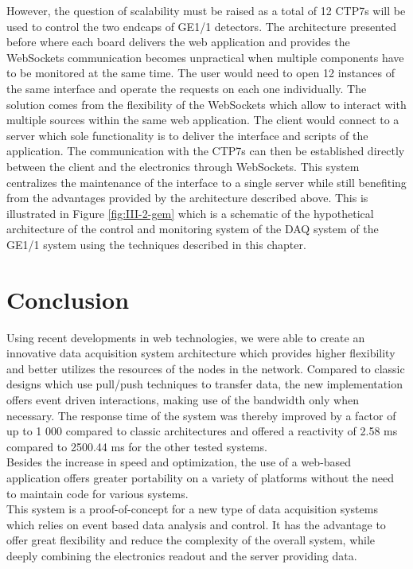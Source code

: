     However, the question of scalability must be raised as a total of 12 CTP7s will be used to control the two endcaps of GE1/1 detectors. The architecture presented before where each board delivers the web application and provides the WebSockets communication becomes unpractical when multiple components have to be monitored at the same time. The user would need to open 12 instances of the same interface and operate the requests on each one individually. The solution comes from the flexibility of the WebSockets which allow to interact with multiple sources within the same web application. The client would connect to a server which sole functionality is to deliver the interface and scripts of the application. The communication with the CTP7s can then be established directly between the client and the electronics through WebSockets. This system centralizes the maintenance of the interface to a single server while still benefiting from the advantages provided by the architecture described above. This is illustrated in Figure \ref{fig:III-2-gem} which is a schematic of the hypothetical architecture of the control and monitoring system of the DAQ system of the GE1/1 system using the techniques described in this chapter.

  \section{Conclusion}

    Using recent developments in web technologies, we were able to create an innovative data acquisition system architecture which provides higher flexibility and better utilizes the resources of the nodes in the network. Compared to classic designs which use pull/push techniques to transfer data, the new implementation offers event driven interactions, making use of the bandwidth only when necessary. The response time of the system was thereby improved by a factor of up to 1 000 compared to classic architectures and offered a reactivity of 2.58 ms compared to 2500.44 ms for the other tested systems. \\

    Besides the increase in speed and optimization, the use of a web-based application offers greater portability on a variety of platforms without the need to maintain code for various systems. \\

    This system is a proof-of-concept for a new type of data acquisition systems which relies on event based data analysis and control. It has the advantage to offer great flexibility and reduce the complexity of the overall system, while deeply combining the electronics readout and the server providing data.
